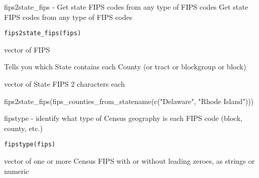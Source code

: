 \documentclass[a4paper]{book}
\begin{document}
%
\begin{Description}\relax
fips2state\_fips - Get state FIPS codes from any type of FIPS codes
Get state FIPS codes from any type of FIPS codes
\end{Description}
%
\begin{Usage}
\begin{verbatim}
fips2state_fips(fips)
\end{verbatim}
\end{Usage}
%
\begin{Arguments}
\begin{ldescription}
\item[\code{fips}] vector of FIPS
\end{ldescription}
\end{Arguments}
%
\begin{Details}\relax
Tells you which State contains each County (or tract or blockgroup or block)
\end{Details}
%
\begin{Value}
vector of State FIPS 2 characters each
\end{Value}
%
\begin{Examples}
\begin{ExampleCode}
  fips2state_fips(fips_counties_from_statename(c("Delaware", "Rhode Island")))
\end{ExampleCode}
\end{Examples}
%
\begin{Description}\relax
fipstype  -  identify what type of Census geography is each FIPS code (block, county, etc.)
\end{Description}
%
\begin{Usage}
\begin{verbatim}
fipstype(fips)
\end{verbatim}
\end{Usage}
%
\begin{Arguments}
\begin{ldescription}
\item[\code{fips}] vector of one or more Census FIPS with or without leading zeroes, as strings or numeric
\end{ldescription}
\end{Arguments}
\end{document}
